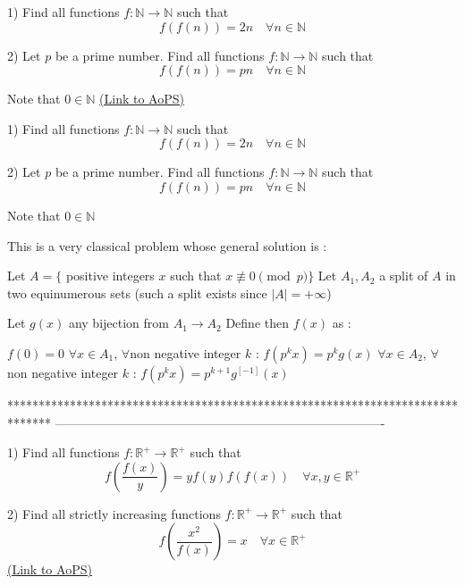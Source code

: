 \begin{problem}
	1) Find all functions $f:\mathbb{N}\to\mathbb{N}$ such that
\[f(f(n))=2n \quad \forall n\in \mathbb{N}\]

2) Let $p$ be a prime number. Find all functions $f:\mathbb{N}\to\mathbb{N}$ such that
\[f(f(n))=pn \quad  \forall n\in \mathbb{N}\]

Note that $0\in \mathbb{N}$
	\flushright \href{https://artofproblemsolving.com/community/c6h561941}{(Link to AoPS)}
\end{problem}



\begin{solution}
	\begin{tcolorbox}1) Find all functions $f:\mathbb{N}\to\mathbb{N}$ such that
\[f(f(n))=2n \quad \forall n\in \mathbb{N}\]

2) Let $p$ be a prime number. Find all functions $f:\mathbb{N}\to\mathbb{N}$ such that
\[f(f(n))=pn \quad  \forall n\in \mathbb{N}\]

Note that $0\in \mathbb{N}$\end{tcolorbox}
This is a very classical problem whose general solution is :

Let $A=\{$ positive integers $x$ such that $x\not\equiv 0\pmod p\}$
Let $A_1,A_2$ a split of $A$ in two equinumerous sets (such a split exists since $|A|=+\infty$)

Let $g(x)$ any bijection from $A_1\to A_2$
Define  then $f(x)$ as :

$f(0)=0$
$\forall x\in A_1$, $\forall $non negative integer $k$ : $f(p^kx)=p^kg(x)$ 
$\forall x\in A_2$, $\forall $non negative integer $k$ : $f(p^kx)=p^{k+1}g^{[-1]}(x)$
\end{solution}
*******************************************************************************
-------------------------------------------------------------------------------

\begin{problem}
	1) Find all functions $f:\mathbb{R}^+\to\mathbb{R}^+$ such that
\[f\left ( \frac{f(x)}{y} \right )=yf(y)f(f(x))\quad \forall x,y\in \mathbb{R}^+\]

2) Find all strictly increasing functions $f:\mathbb{R}^+\to\mathbb{R}^+$ such that
\[f\left ( \frac{x^2}{f(x)} \right )=x \quad \forall x\in \mathbb{R}^+\]
	\flushright \href{https://artofproblemsolving.com/community/c6h561947}{(Link to AoPS)}
\end{problem}



